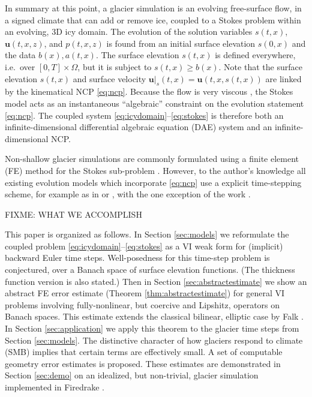 \documentclass[hidelinks,onefignum,onetabnum,final]{siamart220329}  %
\newcommand{\bu}{\mathbf{u}}
\begin{document}
In summary at this point, a glacier simulation is an evolving free-surface flow, in a signed climate that can add or remove ice, coupled to a Stokes problem within an evolving, 3D icy domain.  The evolution of the solution variables $s(t,x)$, $\bu(t,x,z)$, and $p(t,x,z)$ is found from an initial surface elevation $s(0,x)$ and the data $b(x),a(t,x)$.  The surface elevation $s(t,x)$ is defined everywhere, i.e.~over $[0,T]\times \Omega$, but it is subject to $s(t,x) \ge b(x)$.  Note that the surface elevation $s(t,x)$ and surface velocity $\bu|_s(t,x)=\bu(t,x,s(t,x))$ are linked by the kinematical NCP \eqref{eq:ncp}.  Because the flow is very viscous \cite{Acheson1990}, the Stokes model acts as an instantaneous ``algebraic'' constraint on the evolution statement \eqref{eq:ncp}.  The coupled system \eqref{eq:icydomain}--\eqref{eq:stokes} is therefore both an infinite-dimensional differential algebraic equation (DAE) system \cite{AscherPetzold1998} and an infinite-dimensional NCP.

Non-shallow glacier simulations are commonly formulated using a finite element (FE) method for the Stokes sub-problem \cite{IsaacStadlerGhattas2015,Jouvetetal2008,Pattynetal2008}.  However, to the author's knowledge all existing evolution models which incorporate \eqref{eq:ncp} use a explicit time-stepping scheme, for example as in \cite{Jouvetetal2008} or \cite{LofgrenAhlkronaHelanow2022}, with the one exception of the work \cite{WirbelJarosch2020}.

FIXME: WHAT WE ACCOMPLISH

This paper is organized as follows.  In Section \ref{sec:models} we reformulate the coupled problem \eqref{eq:icydomain}--\eqref{eq:stokes} as a VI weak form for (implicit) backward Euler time steps.  Well-posedness for this time-step problem is conjectured, over a Banach space of surface elevation functions.  (The thickness function version is also stated.)  Then in Section \ref{sec:abstractestimate} we show an abstract FE error estimate (Theorem \ref{thm:abstractestimate}) for general VI problems involving fully-nonlinear, but coercive and Lipshitz, operators on Banach spaces.  This estimate extends the classical bilinear, elliptic case by Falk \cite{Falk1974}.  In Section \ref{sec:application} we apply this theorem to the glacier time steps from Section \ref{sec:models}.  The distinctive character of how glaciers respond to climate (SMB) implies that certain terms are effectively small.  A set of computable geometry error estimates is proposed.  These estimates are demonstrated in Section \ref{sec:demo} on an idealized, but non-trivial, glacier simulation implemented in Firedrake \cite{Hametal2023}.
\end{document}
